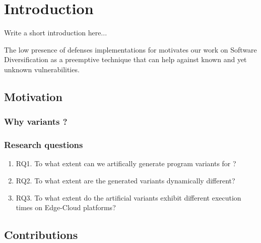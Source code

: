 \chapter{Introduction}

\newcommand{\rqone}{RQ1. To what extent can we artifically generate program variants for \wasm?}

\newcommand{\rqtwo}{RQ2. To what extent are the generated variants dynamically different?}
\newcommand{\rqthree}{RQ3. To what extent do the artificial variants exhibit different execution times on Edge-Cloud platforms?}

Write a short introduction here...


The low presence of defenses implementations for \wasm motivates our work on Software Diversification as a preemptive technique that can help against known and yet unknown vulnerabilities.

\section{Motivation}

\subsection{Why variants ?}

\subsection{Research questions}
\label{intro:definition:rq}


\begin{enumerate}
    \item \rqone
    \item \rqtwo
    \item \rqthree
\end{enumerate}


\section{Contributions}